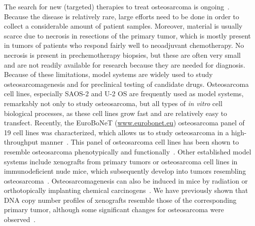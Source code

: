 The search for new (targeted) therapies to treat osteosarcoma
is ongoing~\cite{hattinger2010emerging}. Because the disease is relatively
rare, large efforts need to be done in order to collect a
considerable amount of patient samples. Moreover,
material is usually scarce due to necrosis in resections
of the primary tumor, which is mostly present in tumors
of patients who respond fairly well to neoadjuvant chemotherapy.
No necrosis is present in prechemotherapy
biopsies, but these are often very small and are not
readily available for research because they are needed
for diagnosis. Because of these limitations, model systems
are widely used to study osteosarcomagenesis and
for preclinical testing of candidate drugs. Osteosarcoma
cell lines, especially SAOS-2 and U-2 OS are frequently
used as model systems, remarkably not only to study
osteosarcoma, but all types of {\it in vitro} cell biological
processes, as these cell lines grow fast and are relatively
easy to transfect. Recently, the EuroBoNeT (\url{www.eurobonet.eu}) osteosarcoma panel of 19 cell lines was
characterized, which allows us to study osteosarcoma in
a high\hyp{}throughput manner~\cite{ottaviano2010molecular}. This panel of osteosarcoma
cell lines has been shown to resemble osteosarcoma
phenotypically and functionally~\cite{mohseny2011functional}. Other
established model systems include xenografts from primary
tumors or osteosarcoma cell lines in immunodeficient
nude mice, which subsequently develop into
tumors resembling osteosarcoma~\cite{mohseny2011functional,mayordomo2010tissue,kresse2011preclinical}. Osteosarcomagenesis
can also be induced in mice by radiation or
orthotopically implanting chemical carcinogens~\cite{jones2011osteosarcomagenesis}. We
have previously shown that DNA copy number profiles
of xenografts resemble those of the corresponding primary
tumor, although some significant changes for
osteosarcoma were observed~\cite{kresse2011preclinical}.

